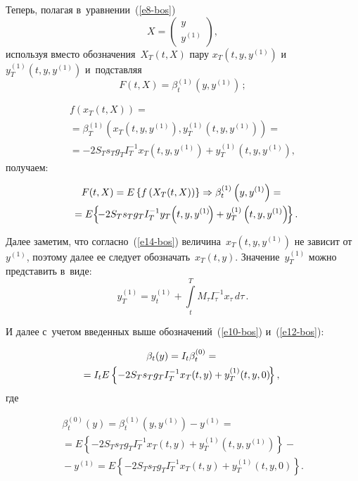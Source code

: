 \begin{multicols}{2}
     Теперь, полагая в~уравнении~(\ref{e8-bos}) 
     $$
     X=\begin{pmatrix} y\\ 
y^{(1)}\end{pmatrix},
$$
 используя вместо обозначения~$X_T(t,X)$ пару 
$x_T\left(t, y, y^{(1)}\right)$ и~$y_T^{(1)}\left(t,y,y^{(1)}\right)$ и~подставляя 
$$
     F(t,X)=\beta_t^{(1)}\left( y,y^{(1)}\right)\,;
  $$
  
    
  
  \noindent
  \begin{multline*}
    f\left( x_T(t,X)\right)={}\\
    {}=\beta_T^{(1)}\left( x_T\left( t,y,y^{(1)}\right),
y_T^{(1)}\left( t,y, y^{(1)}\right)\right)  ={} \\
{}= -2S_T s_T g_T I_T^{-1} x_T \left( t,y, 
y^{(1)}\right)+ y_T^{(1)}\left(t,y,y^{(1)}\right),
    \end{multline*}
     получаем:
     
     \noindent
     \begin{multline*}
     F(t,X)=E\left\{ f\left( X_T(t,X)\right) \right\} \Rightarrow \beta_t^{(1)}\left( 
y,y^{(1)}\right) ={}\\
\hspace*{-2pt}{}= E\!\left\{\! -2S_T s_T g_T I_T^{-1} y_T\!\left( t,y,y^{(1)}\!\right) + 
y_T^{(1)}\left( t,y,y^{(1)}\right)\!\right\}.\hspace*{-6.56989pt}
     \end{multline*}
     
     Далее заметим, что согласно~(\ref{e14-bos}) величина~$x_T\left( 
t,y,y^{(1)}\right)$ не зависит от~$y^{(1)}$, поэтому далее ее следует 
обозначать~$x_T(t,y)$. Значение~$y_T^{(1)}$ можно представить в~виде: 
     $$
     y_T^{(1)}=y_t^{(1)}+\int\limits_t^T M_\tau I_\tau^{-1} x_\tau\,d\tau\,.
     $$
     
     И далее с~учетом введенных выше обозначений~(\ref{e10-bos}) 
и~(\ref{e12-bos}):
     
     \noindent
     \begin{multline}
     \beta_t(y)=I_t\beta_t^{(0)}={}\\
     \hspace*{-3mm}{}=I_tE\left\{ -2S_T s_T g_T I_T^{-1} x_T(t,y) +
     y_T^{(1)}(t,y,0)\!\right\},\!\!
     \label{e15-bos}
     \end{multline}
     где
     
     \noindent
     \begin{multline*}
     \beta_t^{(0)}(y)=\beta_t^{(1)}\left( y,y^{(1)}\right) -y^{(1)}={}\\
     {}=E\left\{ 
     -2S_T s_T g_T I_T^{-1}x_T(t,y) +y_T^{(1)}\left( t,y,y^{(1)}\right)\right\}-{}\\
     {}-
y^{(1)}=
E\left\{ -2S_T s_T g_T I_T^{-1} x_T(t,y)+y_T^{(1)}\left( 
t,y,0\right)\right\}.
     \end{multline*}
     

\end{multicols}
